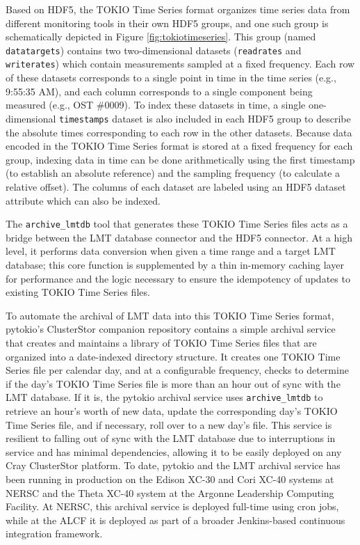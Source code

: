 Based on HDF5, the TOKIO Time Series format organizes time series data from different monitoring tools in their own HDF5 groups, and one such group is schematically depicted in Figure \ref{fig:tokiotimeseries}.
This group (named \texttt{datatargets}) contains two two-dimensional datasets (\texttt{readrates} and \texttt{writerates}) which contain measurements sampled at a fixed frequency.
Each row of these datasets corresponds to a single point in time in the time series (e.g., 9:55:35 AM), and each column corresponds to a single component being measured (e.g., OST \#0009).
To index these datasets in time, a single one-dimensional \texttt{timestamps} dataset is also included in each HDF5 group to describe the absolute times corresponding to each row in the other datasets.
Because data encoded in the TOKIO Time Series format is stored at a fixed frequency for each group, indexing data in time can be done arithmetically using the first timestamp (to establish an absolute reference) and the sampling frequency (to calculate a relative offset).
The columns of each dataset are labeled using an HDF5 dataset attribute which can also be indexed.

The \texttt{archive\_lmtdb} tool that generates these TOKIO Time Series files acts as a bridge between the LMT database connector and the HDF5 connector.
At a high level, it performs data conversion when given a time range and a target LMT database; this core function is supplemented by a thin in-memory caching layer for performance and the logic necessary to ensure the idempotency of updates to existing TOKIO Time Series files.

To automate the archival of LMT data into this TOKIO Time Series format, pytokio's ClusterStor companion repository contains a simple archival service that creates and maintains a library of TOKIO Time Series files that are organized into a date-indexed directory structure.
It creates one TOKIO Time Series file per calendar day, and at a configurable frequency, checks to determine if the day's TOKIO Time Series file is more than an hour out of sync with the LMT database.
If it is, the pytokio archival service uses \texttt{archive\_lmtdb} to retrieve an hour's worth of new data, update the corresponding day's TOKIO Time Series file, and if necessary, roll over to a new day's file.
This service is resilient to falling out of sync with the LMT database due to interruptions in service and has minimal dependencies, allowing it to be easily deployed on any Cray ClusterStor platform.
To date, pytokio and the LMT archival service has been running in production on the Edison XC-30 and Cori XC-40 systems at NERSC and the Theta XC-40 system at the Argonne Leadership Computing Facility. At NERSC, this archival service is deployed full-time using cron jobs, while at the ALCF it is deployed as part of a broader Jenkins-based continuous integration framework.

